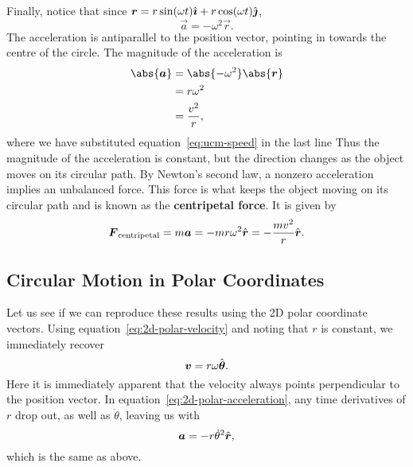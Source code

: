 \documentclass[../classical_mechanics.tex]{subfiles}
\begin{document}
            Finally, notice that since $\boldsymbol{r}=r\sin(\omega t)\hat{\boldsymbol{\imath}}+r\cos(\omega t)\hat{\boldsymbol{\jmath}}$,
            \begin{equation}
                \vec{a}=-\omega^2\vec{r}.
            \end{equation}
            The acceleration is antiparallel to the position vector, pointing in towards the centre of the circle.
            The magnitude of the acceleration is
            \begin{align}
                \abs{\vec{a}}&=\abs{-\omega^2}\abs{\vec{r}}\\
                &=r\omega^2\\
                &=\frac{v^2}{r},
            \end{align}
            where we have substituted equation~\ref{eq:ucm-speed} in the last line
            Thus the magnitude of the acceleration is constant, but the direction changes as the object moves on its circular path.
            By Newton's second law, a nonzero acceleration implies an unbalanced force.
            This force is what keeps the object moving on its circular path and is known as the \textbf{centripetal force}.
            It is given by
            \begin{equation}
                \boldsymbol{F}_\text{centripetal}=m\boldsymbol{a}=-mr\omega^2\hat{\boldsymbol{r}}=-\frac{mv^2}{r}\hat{\boldsymbol{r}}.
            \end{equation}

        \subsection{Circular Motion in Polar Coordinates}\label{subsec:circular-motion-in-polar-coordinates}
            Let us see if we can reproduce these results using the 2D polar coordinate vectors.
            Using equation~\ref{eq:2d-polar-velocity} and noting that $r$ is constant, we immediately recover
            \begin{equation}
                \boldsymbol{v}=r\omega\hat{\boldsymbol{\theta}}.
            \end{equation}
            Here it is immediately apparent that the velocity always points perpendicular to the position vector.
            In equation~\ref{eq:2d-polar-acceleration}, any time derivatives of $r$ drop out, as well as $\ddot{\theta}$, leaving us with
            \begin{equation}
                \boldsymbol{a}=-r\dot{\theta}^2\hat{\boldsymbol{r}},
            \end{equation}
            which is the same as above.       
        
\end{document}
